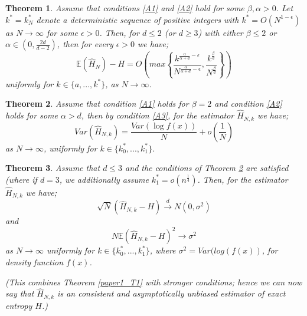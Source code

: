 \documentclass{article}
\newtheorem{theorem}{Theorem}
\begin{document}
\begin{theorem} \label{paper4_T1}
Assume that conditions \ref{A1} and \ref{A2} hold for some $\beta, \alpha > 0$. Let  $k^{*} = k_{N}^{*}$ denote a deterministic sequence of positive integers with $k^{*} = O(N^{1-\epsilon})$ as $N \to \infty$  for some $\epsilon > 0$. Then, for $d \leq 2$ (or $d \geq 3$) with either $\beta \leq 2$ or $\alpha \in (0, \frac{2d}{d-2})$, then for every $\epsilon >0$ we have;
\begin{equation}
\mathbb{E} ( \hat{H}_{N} ) - H = O \left( max \left\{ \frac{k^{\frac{\alpha}{\alpha + d} - \epsilon}}{N^{\frac{\alpha}{\alpha + d} - \epsilon}}, \frac{k^{\frac{\beta}{d}}}{N^{\frac{\beta}{d}}} \right\} \right)
\end{equation}
uniformly for $k \in \{ a, ..., k^{*}\}$, as $N \to \infty$.
\end{theorem}


\begin{theorem}\label{paper4_T4}
Assume that condition \ref{A1} holds for $\beta = 2$ and condition \ref{A2} holds for some $\alpha > d$, then by condition \ref{A3}, for the estimator $\hat{H}_{N, k}$ we have;
\begin{equation}
Var(\hat{H}_{N, k}) = \frac{Var(\log f(x))}{N} + o(\frac{1}{N}) \nonumber
\end{equation}
as $N \to \infty$, uniformly for $k \in \{ k_{0}^{*}, ...,  k_{1}^{*} \}$.
\end{theorem}

\begin{theorem} \label{paper4_T5}
Assume that $d \leq 3$ and the conditions of Theorem \ref{paper4_T4} are satisfied (where if $d=3$, we additionally assume $k_{1}^{*} = o(n^{\frac{1}{4}})$. Then, for the estimator $\hat{H}_{N, k}$ we have;
\begin{equation} \label{est_dist}
\sqrt{N}(\hat{H}_{N, k} - H) \xrightarrow{d} N(0, \sigma^2)
\end{equation}
and 
\begin{equation} \label{est_consist}
N \mathbb{E}{(\hat{H}_{N, k} - H)^2} \xrightarrow{} \sigma^2
\end{equation}
as $N \to \infty$ uniformly for $k \in \{ k_{0}^{*}, ...,  k_{1}^{*} \}$, where $\sigma^2 = Var(log(f(x))$, for density function $f(x)$.

(This combines Theorem \ref{paper1_T1} with stronger conditions; hence we can now say that $\hat{H}_{N, k}$ is an consistent and asymptotically unbiased estimator of exact entropy $H$.)
\end{theorem}
\end{document}
